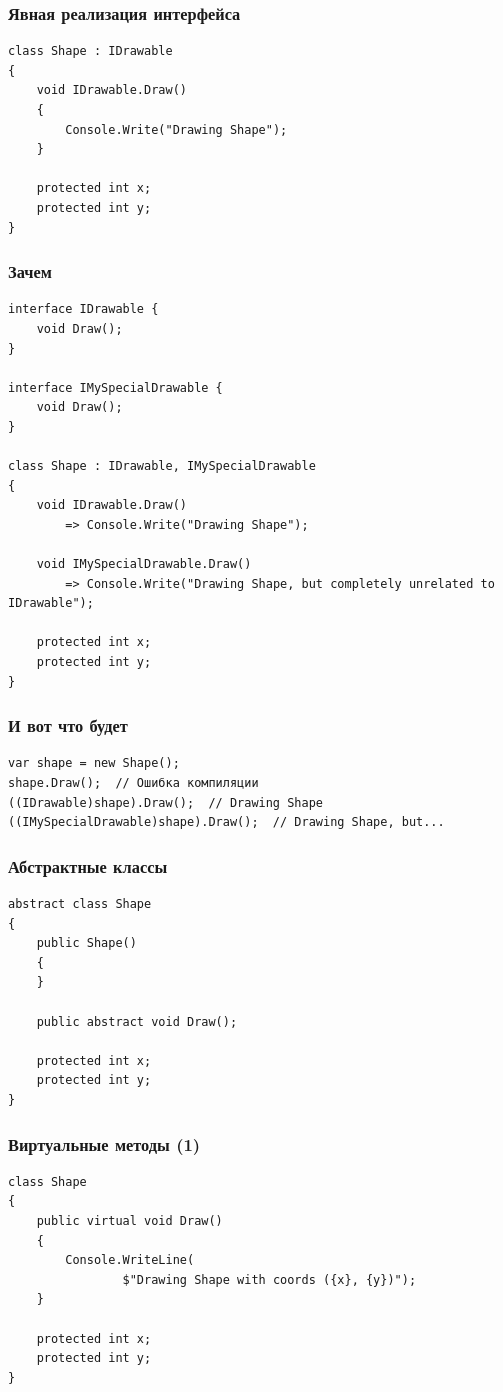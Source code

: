 \documentclass[xetex,mathserif,serif]{beamer}
\begin{document}
	\begin{frame}[fragile]
		\frametitle{Явная реализация интерфейса}
		\begin{verbatim}
class Shape : IDrawable
{
    void IDrawable.Draw()
    {
        Console.Write("Drawing Shape");
    }

    protected int x;
    protected int y;
}
		\end{verbatim}
	\end{frame}

	\begin{frame}[fragile]
		\frametitle{Зачем}
		\begin{footnotesize}
			\begin{verbatim}
interface IDrawable {
    void Draw();
}

interface IMySpecialDrawable {
    void Draw();
}

class Shape : IDrawable, IMySpecialDrawable
{
    void IDrawable.Draw()
        => Console.Write("Drawing Shape");

    void IMySpecialDrawable.Draw()
        => Console.Write("Drawing Shape, but completely unrelated to IDrawable");

    protected int x;
    protected int y;
}
			\end{verbatim}
		\end{footnotesize}
	\end{frame}

	\begin{frame}[fragile]
		\frametitle{И вот что будет}
		\begin{verbatim}
var shape = new Shape();
shape.Draw();  // Ошибка компиляции
((IDrawable)shape).Draw();  // Drawing Shape
((IMySpecialDrawable)shape).Draw();  // Drawing Shape, but...
		\end{verbatim}
	\end{frame}

	\begin{frame}[fragile]
		\frametitle{Абстрактные классы}
		\begin{verbatim}
abstract class Shape
{
    public Shape() 
    {
    }

    public abstract void Draw();

    protected int x;
    protected int y;
}
		\end{verbatim}
	\end{frame}

	\begin{frame}[fragile]
		\frametitle{Виртуальные методы (1)}
		\begin{verbatim}
class Shape
{
    public virtual void Draw()
    {
        Console.WriteLine(
                $"Drawing Shape with coords ({x}, {y})");
    }

    protected int x;
    protected int y;
}
		\end{verbatim}
	\end{frame}
\end{document}
